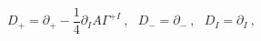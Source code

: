 \begin{equation}
D_+ = \partial_+ - \frac{1}{4} \partial_I A \Gamma^{+I} ~,~~~
D_- = \partial_- ~,~~~
D_I = \partial_I ~,
\end{equation}

